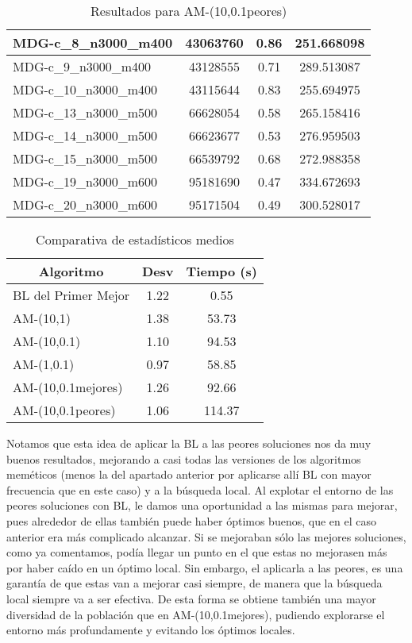 \documentclass[10pt,a4paper]{article}
\begin{document}
\begin{table}[H]
\begin{center}
\begin{tabular}{|l|c|c|c|}
					MDG-c\_8\_n3000\_m400 & 43063760 & 0.86 & 251.668098 \\ \hline
					MDG-c\_9\_n3000\_m400 & 43128555 & 0.71 & 289.513087 \\ \hline
					MDG-c\_10\_n3000\_m400 & 43115644 & 0.83 & 255.694975 \\ \hline
					MDG-c\_13\_n3000\_m500 & 66628054 & 0.58 & 265.158416 \\ \hline
					MDG-c\_14\_n3000\_m500 & 66623677 & 0.53 & 276.959503 \\ \hline
					MDG-c\_15\_n3000\_m500 & 66539792 & 0.68 & 272.988358 \\ \hline
					MDG-c\_19\_n3000\_m600 & 95181690 & 0.47 & 334.672693 \\ \hline
					MDG-c\_20\_n3000\_m600 & 95171504 & 0.49 & 300.528017 \\ \hline
				\end{tabular}
				\caption{Resultados para AM-(10,0.1peores) }
				\label{}
				\end{center}
			\end{table}
		
			\begin{table}[H]
			\begin{center}
				\begin{tabular}{|l|c|c|}
					\hline
					\multicolumn{1}{|c|}{\textbf{Algoritmo}} & \textbf{Desv} & \textbf{Tiempo (s)} \\ \hline
					BL del Primer Mejor & 1.22 & 0.55 \\ \hline
					AM-(10,1) & 1.38 & 53.73 \\ \hline
					AM-(10,0.1) & 1.10 & 94.53 \\ \hline
					AM-(1,0.1) & 0.97 & 58.85 \\ \hline
					AM-(10,0.1mejores) & 1.26 & 92.66 \\ \hline
					AM-(10,0.1peores) & 1.06 & 114.37 \\ \hline
				\end{tabular}
			\end{center}
			\caption{Comparativa de estadísticos medios}
			\label{}
		\end{table}

Notamos que esta idea de aplicar la BL a las peores soluciones nos da muy buenos resultados, mejorando a casi todas las versiones de los algoritmos meméticos (menos la del apartado anterior por aplicarse allí BL con mayor frecuencia que en este caso) y a la búsqueda local. Al explotar el entorno de las peores soluciones con BL, le damos una oportunidad a las mismas para mejorar, pues alrededor de ellas también puede haber óptimos buenos, que en el caso anterior era más complicado alcanzar. Si se mejoraban sólo las mejores soluciones, como ya comentamos, podía llegar un punto en el que estas no mejorasen más por haber caído en un óptimo local. Sin embargo, el aplicarla a las peores, es una garantía de que estas van a mejorar casi siempre, de manera que la búsqueda local siempre va a ser efectiva. De esta forma se obtiene también una mayor diversidad de la población que en AM-(10,0.1mejores), pudiendo explorarse el entorno más profundamente y evitando los óptimos locales. 
\end{document}
